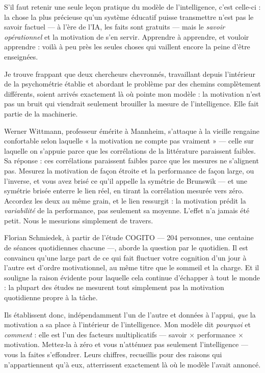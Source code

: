 \documentclass[11pt, twoside, openright]{book}
\begin{document}
S'il faut retenir une seule leçon pratique du modèle de l'intelligence, c'est celle-ci : la chose la plus précieuse qu'un système éducatif puisse transmettre n'est pas le savoir factuel --- à l'ère de l'IA, les faits sont gratuits --- mais le \textit{savoir opérationnel} et la motivation de s'en servir. Apprendre à apprendre, et vouloir apprendre : voilà à peu près les seules choses qui vaillent encore la peine d'être enseignées.

Je trouve frappant que deux chercheurs chevronnés, travaillant depuis l'intérieur de la psychométrie établie et abordant le problème par des chemins complètement différents, soient arrivés exactement là où pointe mon modèle : la motivation n'est pas un bruit qui viendrait seulement brouiller la mesure de l'intelligence. Elle fait partie de la machinerie.

Werner Wittmann, professeur émérite à Mannheim, s'attaque à la vieille rengaine confortable selon laquelle « la motivation ne compte pas vraiment » --- celle sur laquelle on s'appuie parce que les corrélations de la littérature paraissent faibles. Sa réponse : ces corrélations paraissent faibles parce que les mesures ne s'alignent pas. Mesurez la motivation de façon étroite et la performance de façon large, ou l'inverse, et vous avez brisé ce qu'il appelle la symétrie de Brunswik --- et une symétrie brisée enterre le lien réel, en tirant la corrélation mesurée vers zéro. Accordez les deux au même grain, et le lien ressurgit : la motivation prédit la \textit{variabilité} de la performance, pas seulement sa moyenne. L'effet n'a jamais été petit. Nous le mesurions simplement de travers.

Florian Schmiedek, à partir de l'étude COGITO --- 204 personnes, une centaine de séances quotidiennes chacune ---, aborde la question par le quotidien. Il est convaincu qu'une large part de ce qui fait fluctuer votre cognition d'un jour à l'autre est d'ordre motivationnel, au même titre que le sommeil et la charge. Et il souligne la raison évidente pour laquelle cela continue d'échapper à tout le monde : la plupart des études ne mesurent tout simplement pas la motivation quotidienne propre à la tâche.

Ils établissent donc, indépendamment l'un de l'autre et données à l'appui, \textit{que} la motivation a sa place à l'intérieur de l'intelligence. Mon modèle dit \textit{pourquoi} et \textit{comment} : elle est l'un des facteurs multiplicatifs --- savoir × performance × motivation. Mettez-la à zéro et vous n'atténuez pas seulement l'intelligence --- vous la faites s'effondrer. Leurs chiffres, recueillis pour des raisons qui n'appartiennent qu'à eux, atterrissent exactement là où le modèle l'avait annoncé.
\end{document}
